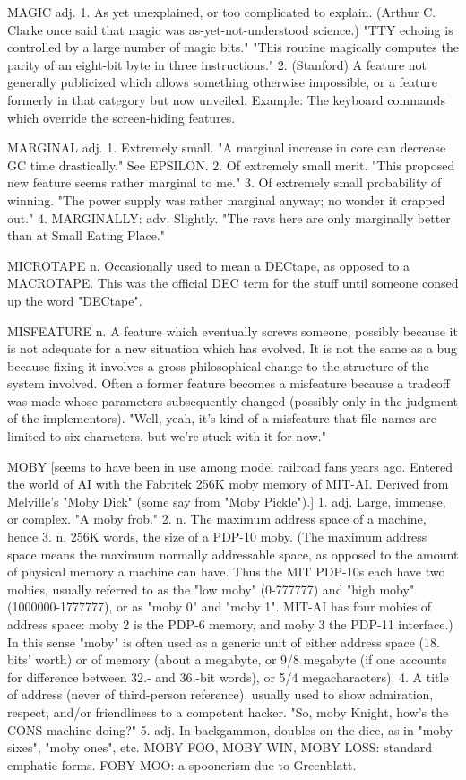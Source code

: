 MAGIC adj. 1. As yet unexplained, or too complicated to explain.
   (Arthur C. Clarke once said that magic was as-yet-not-understood
   science.)  "TTY echoing is controlled by a large number of magic
   bits."  "This routine magically computes the parity of an eight-bit
   byte in three instructions."	 2. (Stanford) A feature not generally
   publicized which allows something otherwise impossible, or a
   feature formerly in that category but now unveiled.	Example: The
   keyboard commands which override the screen-hiding features.

MARGINAL adj. 1. Extremely small.  "A marginal increase in core can
   decrease GC time drastically."  See EPSILON.	 2. Of extremely small
   merit.  "This proposed new feature seems rather marginal to me."
   3. Of extremely small probability of winning.  "The power supply
   was rather marginal anyway; no wonder it crapped out."  4.
   MARGINALLY: adv. Slightly.  "The ravs here are only marginally
   better than at Small Eating Place."

MICROTAPE n. Occasionally used to mean a DECtape, as opposed to a
   MACROTAPE.  This was the official DEC term for the stuff until
   someone consed up the word "DECtape".

MISFEATURE n. A feature which eventually screws someone, possibly
   because it is not adequate for a new situation which has evolved.
   It is not the same as a bug because fixing it involves a gross
   philosophical change to the structure of the system involved.
   Often a former feature becomes a misfeature because a tradeoff was
   made whose parameters subsequently changed (possibly only in the
   judgment of the implementors).  "Well, yeah, it's kind of a
   misfeature that file names are limited to six characters, but we're
   stuck with it for now."

MOBY [seems to have been in use among model railroad fans years ago.
   Entered the world of AI with the Fabritek 256K moby memory of
   MIT-AI.  Derived from Melville's "Moby Dick" (some say from "Moby
   Pickle").] 1. adj. Large, immense, or complex.  "A moby frob."  2.
   n. The maximum address space of a machine, hence 3. n. 256K words,
   the size of a PDP-10 moby.  (The maximum address space means the
   maximum normally addressable space, as opposed to the amount of
   physical memory a machine can have.	Thus the MIT PDP-10s each have
   two mobies, usually referred to as the "low moby" (0-777777) and
   "high moby" (1000000-1777777), or as "moby 0" and "moby 1".	MIT-AI
   has four mobies of address space: moby 2 is the PDP-6 memory, and
   moby 3 the PDP-11 interface.)  In this sense "moby" is often used
   as a generic unit of either address space (18. bits' worth) or of
   memory (about a megabyte, or 9/8 megabyte (if one accounts for
   difference between 32.- and 36.-bit words), or 5/4 megacharacters).
   4. A title of address (never of third-person reference), usually
   used to show admiration, respect, and/or friendliness to a
   competent hacker.  "So, moby Knight, how's the CONS machine doing?"
   5. adj. In backgammon, doubles on the dice, as in "moby sixes",
   "moby ones", etc.
   MOBY FOO, MOBY WIN, MOBY LOSS: standard emphatic forms.
   FOBY MOO: a spoonerism due to Greenblatt.

